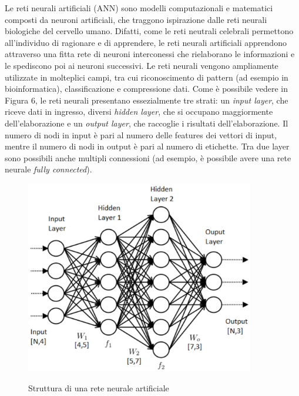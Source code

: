 \documentclass[11pt]{article}
\begin{document}
Le reti neurali artificiali (ANN) sono modelli computazionali e matematici composti da neuroni artificiali, che traggono ispirazione dalle reti neurali biologiche del cervello umano. Difatti, come le reti neutrali celebrali permettono all'individuo di ragionare e di apprendere, le reti neurali artificiali apprendono attraverso una fitta rete di neuroni interconessi che rielaborano le informazioni e le spediscono poi ai neuroni successivi. Le reti neurali vengono ampliamente utilizzate in molteplici campi, tra cui riconoscimento di pattern (ad esempio in bioinformatica), classificazione e compressione dati. Come è possibile vedere in Figura 6, le reti neurali presentano essezialmente tre strati: un \textit{input layer}, che riceve dati in ingresso, diversi \textit{hidden layer}, che si occupano maggiormente dell'elaborazione e un \textit{output layer}, che raccoglie i risultati dell'elaborazione. Il numero di nodi in input è pari al numero delle features dei vettori di input, mentre il numero di nodi in output è pari al numero di etichette.  Tra due layer sono possibili anche multipli connessioni (ad esempio, è possibile avere una rete neurale \textit{fully connected}). 

\begin{figure}[h!]
\begin{center}
  \includegraphics[width=10cm]{Immagini/ReteNeurale.png}\\
  \caption{Struttura di una rete neurale artificiale}
\end{center}
\end{figure}
\end{document}
